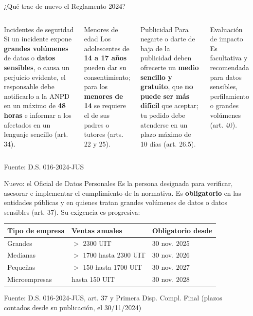\documentclass[aspectratio=169,11pt]{beamer}
\newcommand{\fuente}[1]{\par\vfill\hfill{\tiny\color{gray}Fuente: #1}}
\begin{document}
\begin{frame}{¿Qué trae de nuevo el Reglamento 2024?}
\small
\begin{columns}[T]
\begin{block}{Incidentes de seguridad}
Si un incidente expone \textbf{grandes volúmenes} de datos o \textbf{datos sensibles}, o causa un perjuicio evidente, el responsable debe notificarlo a la ANPD en un máximo de \textbf{48 horas} e informar a los afectados en un lenguaje sencillo (art. 34).
\end{block}
\begin{block}{Menores de edad}
Los adolescentes de \textbf{14 a 17 años} pueden dar su consentimiento; para los \textbf{menores de 14} se requiere el de sus padres o tutores (arts. 22 y 25).
\end{block}
\begin{block}{Publicidad}
Para negarte o darte de baja de la publicidad deben ofrecerte un \textbf{medio sencillo y gratuito}, que \textbf{no puede ser más difícil} que aceptar; tu pedido debe atenderse en un plazo máximo de 10 días (art. 26.5).
\end{block}
\begin{block}{Evaluación de impacto}
Es facultativa y recomendada para datos sensibles, perfilamiento o grandes volúmenes (art. 40).
\end{block}
\end{columns}
\fuente{D.S. 016-2024-JUS}
\end{frame}

\begin{frame}{Nuevo: el Oficial de Datos Personales}
\small Es la persona designada para verificar, asesorar e implementar el cumplimiento de la normativa. Es \textbf{obligatorio} en las entidades públicas y en quienes tratan grandes volúmenes de datos o datos sensibles (art. 37). Su exigencia es progresiva:

\vspace{2mm}
\centering
\begin{tabular}{@{}lll@{}}
\toprule
Tipo de empresa & Ventas anuales & Obligatorio desde \\
\midrule
Grandes & $>$ 2300 UIT & 30 nov. 2025 \\
Medianas & $>$ 1700 hasta 2300 UIT & 30 nov. 2026 \\
Pequeñas & $>$ 150 hasta 1700 UIT & 30 nov. 2027 \\
Microempresas & hasta 150 UIT & 30 nov. 2028 \\
\bottomrule
\end{tabular}
\fuente{D.S. 016-2024-JUS, art. 37 y Primera Disp. Compl. Final (plazos contados desde su publicación, el 30/11/2024)}
\end{frame}
\end{document}
